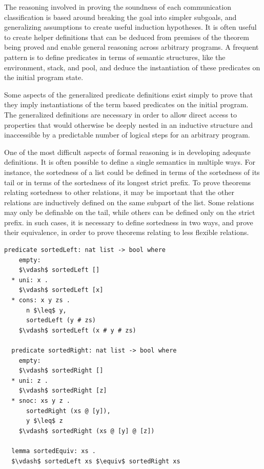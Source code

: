 \documentclass[letterpaper, 11pt]{report}
\begin{document}
The reasoning involved in proving the soundness of each communication classification
is based around breaking the goal into simpler subgoals, and generalizing assumptions to create
useful induction hypotheses. It is often useful to
create helper definitions that can be deduced
from premises of the theorem being proved and enable
general reasoning across arbitrary programs.
A frequent pattern is to define
predicates in terms of semantic structures, like the environment, stack, and pool, and deduce 
the instantiation of these predicates on the initial program state. 

Some aspects of the generalized predicate definitions exist simply to prove that they imply
instantiations of the term based predicates on the initial program. The generalized
definitions are necessary in order to allow direct access to properties that would
otherwise be deeply nested
in an inductive structure and inaccessible by a predictable number of
logical steps for an arbitrary program.

One of the most difficult aspects of formal reasoning is in developing adequate definitions.
It is often possible to define a single semantics in multiple ways.
For instance, the sortedness of a list could be defined in terms of the sortedness of its tail
or in terms of the sortedness of its longest strict prefix. To prove theorems relating
sortedness to other relations, it may be important that the other relations are inductively
defined on the same subpart of the list. Some relations may only be definable on the tail,
while others can be defined only on the strict prefix. in such cases, it is necessary to
define sortedness in two ways, and prove their equivalence, in order to prove theorems relating
to less flexible relations.

\begin{lstlisting}[language=logic, mathescape]
  predicate sortedLeft: nat list -> bool where
    empty:
    $\vdash$ sortedLeft []
  * uni: x .
    $\vdash$ sortedLeft [x]
  * cons: x y zs .
      n $\leq$ y,
      sortedLeft (y # zs)
    $\vdash$ sortedLeft (x # y # zs)

  predicate sortedRight: nat list -> bool where
    empty:
    $\vdash$ sortedRight []
  * uni: z .
    $\vdash$ sortedRight [z]
  * snoc: xs y z .
      sortedRight (xs @ [y]),
      y $\leq$ z 
    $\vdash$ sortedRight (xs @ [y] @ [z])

  lemma sortedEquiv: xs .
  $\vdash$ sortedLeft xs $\equiv$ sortedRight xs  
\end{lstlisting}
\end{document}
